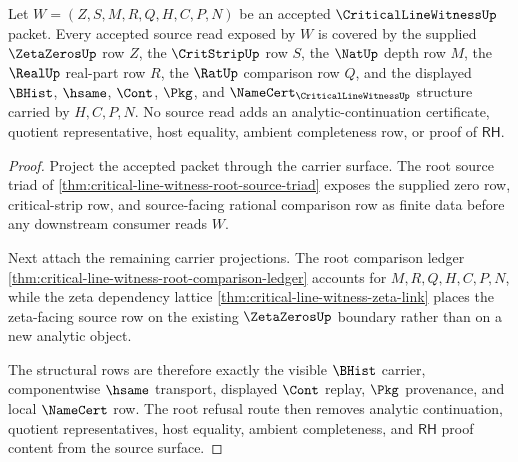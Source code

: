 \begin{theorem}
\label{thm:critical-line-witness-root-source-coverage}
Let $W=(Z,S,M,R,Q,H,C,P,N)$ be an accepted $\CriticalLineWitnessUp$ packet.
Every accepted source read exposed by $W$ is covered by the supplied
$\ZetaZerosUp$ row $Z$, the $\CritStripUp$ row $S$, the $\NatUp$ depth row $M$,
the $\RealUp$ real-part row $R$, the $\RatUp$ comparison row $Q$, and the
displayed $\BHist$, $\hsame$, $\Cont$, $\Pkg$, and
$\NameCert_{\CriticalLineWitnessUp}$ structure carried by $H,C,P,N$. No source
read adds an analytic-continuation certificate, quotient representative, host
equality, ambient completeness row, or proof of $\mathsf{RH}$.
\end{theorem}
\begin{proof}
Project the accepted packet through the carrier surface. The root source triad
of \autoref{thm:critical-line-witness-root-source-triad} exposes the supplied
zero row, critical-strip row, and source-facing rational comparison row as
finite data before any downstream consumer reads $W$.

Next attach the remaining carrier projections. The root comparison ledger
\autoref{thm:critical-line-witness-root-comparison-ledger} accounts for
$M,R,Q,H,C,P,N$, while the zeta dependency lattice
\autoref{thm:critical-line-witness-zeta-link} places the zeta-facing source row
on the existing $\ZetaZerosUp$ boundary rather than on a new analytic object.

The structural rows are therefore exactly the visible $\BHist$ carrier,
componentwise $\hsame$ transport, displayed $\Cont$ replay, $\Pkg$ provenance,
and local $\NameCert$ row. The root refusal route then removes analytic
continuation, quotient representatives, host equality, ambient completeness,
and $\mathsf{RH}$ proof content from the source surface.
\end{proof}

